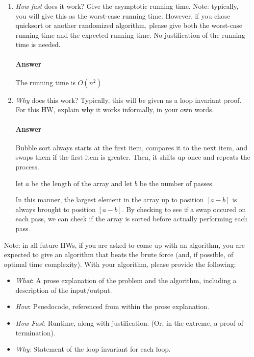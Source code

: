 \documentclass{article}
\begin{document}
\begin{enumerate}
      \item \emph{How fast} does it work?  Give the asymptotic running time.
            Note: typically, you will give this as the worst-case running time.
            However, if you chose quicksort or another randomized algorithm, please
            give both the worst-case running time and the expected running time.  No
            justification of the running time is needed.
            
            \paragraph{Answer} The running time is $O(n^2)$
            
      \item \emph{Why} does this work? Typically, this will be given as a loop
            invariant proof.  For this HW, explain why it works informally, in your
            own words.
            
            \paragraph{Answer}
            Bubble sort always starts at the first item, compares it to the next item,
            and swaps them if the first item is greater. Then, it shifts up once and repeats
            the process. 
            
            let $a$ be the length of the array and let $b$ be the number of passes.
            
            In this manner, the largest element in the array up to position $[a-b]$ is always brought
            to position $[a - b]$. By checking to see if a swap occured on each pass, we can check 
            if the array is sorted before actually performing each pass.
            
\end{enumerate}


Note: in all future HWs, if you are asked to come up with an algorithm, you are
expected to give an algorithm that beats the brute force (and, if possible, of
optimal time complexity). With your algorithm, please provide the following:
\begin{itemize}
      \item \emph{What}: A prose explanation of the problem and the algorithm,
            including a description of the input/output.
      \item \emph{How}: Psuedocode, referenced from within the prose explanation.
      \item \emph{How Fast}: Runtime, along with justification.  (Or, in the
            extreme, a proof of termination).
      \item \emph{Why}: Statement of the loop invariant for each loop.
\end{itemize}
\end{document}

